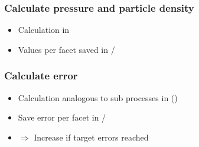 \subsubsection{Calculate pressure and particle density}
\begin{itemize}[noitemsep,topsep=0pt, partopsep=0pt]
\item Calculation in  
\item Values per facet saved in /
\end{itemize}

\subsubsection{Calculate error}
\begin{itemize}[noitemsep,topsep=0pt, partopsep=0pt]
\item Calculation analogous to sub processes in  ()
\item Save error per facet in /
\item[]$\Rightarrow$ Increase  if target errors reached
\end{itemize}


